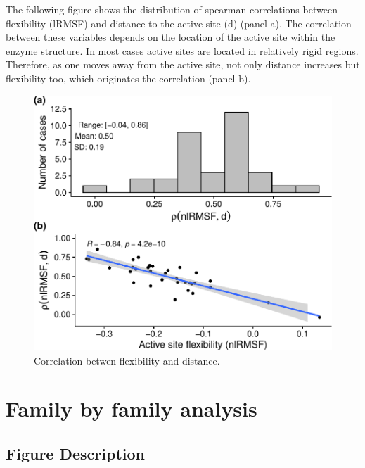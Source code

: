 \documentclass[
]{article}
\begin{document}
The following figure shows the distribution of spearman correlations
between flexibility (lRMSF) and distance to the active site (d) (panel
a). The correlation between these variables depends on the location of
the active site within the enzyme structure. In most cases active sites
are located in relatively rigid regions. Therefore, as one moves away
from the active site, not only distance increases but flexibility too,
which originates the correlation (panel b).

\begin{figure}

{\centering \includegraphics{supplementary_material_files/figure-latex/flex-dist correlation-1} 

}

\caption{Correlation betwen flexibility and distance.}\label{fig:flex-dist correlation}
\end{figure}

\clearpage

\clearpage

\hypertarget{family-by-family-analysis}{%
\section{Family by family analysis}\label{family-by-family-analysis}}

\hypertarget{figure-description}{%
\subsection{Figure Description}\label{figure-description}}
\end{document}
